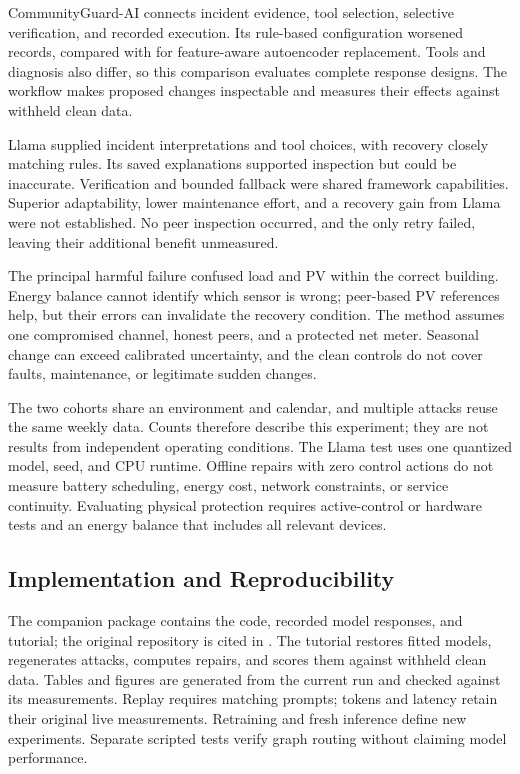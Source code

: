 \documentclass[conference]{IEEEtran}
\begin{document}
CommunityGuard-AI connects incident evidence, tool selection, selective verification, and recorded execution. Its rule-based configuration worsened \HarmN{} records, compared with \TypedHarm{} for feature-aware autoencoder replacement. Tools and diagnosis also differ, so this comparison evaluates complete response designs. The workflow makes proposed changes inspectable and measures their effects against withheld clean data.

Llama supplied incident interpretations and tool choices, with recovery closely matching rules. Its saved explanations supported inspection but could be inaccurate. Verification and bounded fallback were shared framework capabilities. Superior adaptability, lower maintenance effort, and a recovery gain from Llama were not established. No peer inspection occurred, and the only retry failed, leaving their additional benefit unmeasured.

The principal harmful failure confused load and PV within the correct building. Energy balance cannot identify which sensor is wrong; peer-based PV references help, but their errors can invalidate the recovery condition. The method assumes one compromised channel, honest peers, and a protected net meter. Seasonal change can exceed calibrated uncertainty, and the clean controls do not cover faults, maintenance, or legitimate sudden changes.



The two cohorts share an environment and calendar, and multiple attacks reuse the same weekly data. Counts therefore describe this experiment; they are not results from independent operating conditions. The Llama test uses one quantized model, seed, and CPU runtime. Offline repairs with zero control actions do not measure battery scheduling, energy cost, network constraints, or service continuity. Evaluating physical protection requires active-control or hardware tests and an energy balance that includes all relevant devices.

\subsection{Implementation and Reproducibility}

The companion package contains the code, recorded model responses, and tutorial; the original repository is cited in \cite{communityguardcode}. The tutorial restores fitted models, regenerates attacks, computes repairs, and scores them against withheld clean data. Tables and figures are generated from the current run and checked against its measurements. Replay requires matching prompts; tokens and latency retain their original live measurements. Retraining and fresh inference define new experiments. Separate scripted tests verify graph routing without claiming model performance.
\end{document}
